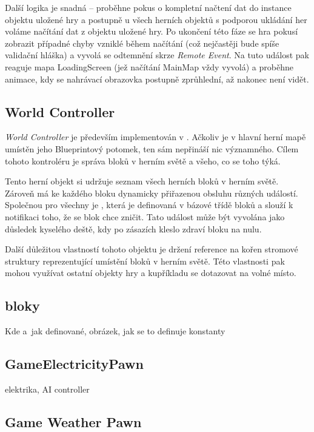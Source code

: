 Další logika je snadná -- proběhne pokus o kompletní načtení dat do instance objektu uložené hry a postupně u všech herních objektů s podporou ukládání her voláme načítání dat z objektu uložené hry. Po ukončení této fáze se hra pokusí zobrazit případné chyby vzniklé během načítání (což nejčastěji bude spíše validační hláška) a vyvolá se odtemnění skrze \textit{Remote Event}. Na tuto událost pak reaguje mapa LoadingScreen (jež načítání MainMap vždy vyvolá) a proběhne animace, kdy se nahrávací obrazovka postupně zprůhlední, až nakonec není vidět.


\subsection{World Controller}

\textit{World Controller} je především implementován v \CPP{}. Ačkoliv je v hlavní herní mapě umístěn jeho Blueprintový potomek, ten sám nepřináší nic významného. Cílem tohoto kontroléru je správa bloků v herním světě a všeho, co se toho týká.

Tento herní objekt si udržuje seznam všech herních bloků v herním světě. Zároveň má ke každého bloku dynamicky přiřazenou obsluhu různých událostí. Společnou pro všechny je , která je definovaná v bázové třídě bloků a slouží k notifikaci toho, že se blok chce zničit. Tato událost může být vyvolána jako důsledek kyselého deště, kdy po zásazích kleslo zdraví bloku na nulu.

Další důležitou vlastností tohoto objektu je držení reference na kořen stromové struktury reprezentující umístění bloků v herním světě. Této vlastnosti pak mohou využívat ostatní objekty hry a kupříkladu se dotazovat na volné místo.


\subsection{bloky}

Kde a~jak definované, obrázek, jak se to definuje konstanty


\subsection{GameElectricityPawn}

elektrika, AI controller

\subsection{Game Weather Pawn}

